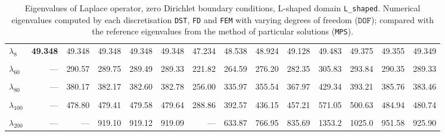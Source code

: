 \begin{table}[htbp]
{{\begin{tabular}{lrrrrrrrrrrrrr}
    $\lambda_{8}$ & \textbf{49.348} & 49.348 & 49.348 & 49.348 & 49.348 & 47.234 & 48.538 & 48.924 & 49.128 & 49.483 & 49.375 & 49.355 & 49.349 \\
    & & & & & & & & & & & & & \\
    $\lambda_{60}$ & --- & 290.57 & 289.75 & 289.49 & 289.33 & 221.82 & 264.59 & 276.20 & 282.35 & 305.83 & 293.84 & 290.35 & 289.33 \\
    & & & & & & & & & & & & & \\
    $\lambda_{80}$ & --- & 380.17 & 382.17 & 382.60 & 382.78 & 256.00 & 335.97 & 355.54 & 367.97 & 429.34 & 393.21 & 385.76 & 383.46 \\
    & & & & & & & & & & & & & \\
    $\lambda_{100}$ & --- & 478.80 & 479.41 & 479.58 & 479.64 & 288.86 & 392.57 & 436.15 & 457.21 & 571.05 & 500.63 & 484.94 & 480.74 \\
    & & & & & & & & & & & & & \\
    $\lambda_{200}$ & --- & --- & 919.10 & 919.12 & 919.09 & --- & 633.87 & 766.95 & 835.69 & 1353.2 & 1025.0 & 951.58 & 925.90 \\
    \bottomrule
  \end{tabular}}}
  \caption{Eigenvalues of Laplace operator, zero Dirichlet boundary conditions, L-shaped domain \texttt{L\_shaped}. Numerical eigenvalues computed by each discretisation \texttt{DST}, \texttt{FD} and \texttt{FEM} with varying degrees of freedom ($\mathtt{DOF}$); compared with the reference eigenvalues from the method of particular solutions (\texttt{MPS}).}
  \label{tab:eigenvalues_head_L_shaped_transposed_extended}
\end{table}
